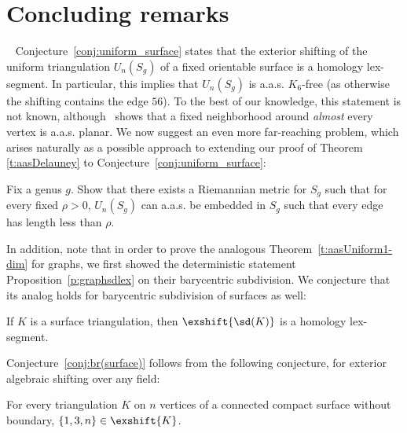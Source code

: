 \section{Concluding remarks}~\label{sec:Conclude}
Conjecture~\ref{conj:uniform_surface} states that the exterior shifting of the uniform triangulation $U_n(S_g)$ of a fixed orientable surface is a homology lex-segment. In particular, this implies that  $U_n(S_g)$ is a.a.s. $K_6$-free (as otherwise the shifting contains the edge $56$). 
To the best of our knowledge, this statement is not known, although~\cite{budzinski2022multi} shows that a fixed neighborhood around \textit{almost} every vertex is a.a.s. planar. We now suggest an even more far-reaching problem, which arises naturally as a possible approach to extending our proof of Theorem \ref{t:aasDelauney} to Conjecture~\ref{conj:uniform_surface}:
%
\begin{problem}
    Fix a genus $g$. Show that there exists a Riemannian metric for $S_g$ such that for every fixed $\rho>0$, $U_n(S_g)$ can a.a.s. be embedded in $S_g$  such that every edge has length less than $\rho$. 
\end{problem}
%
%
In addition, note that in order to prove the analogous Theorem~\ref{t:aasUniform1-dim} for graphs, we first showed the deterministic statement Proposition~\ref{p:graphsdlex} on their barycentric subdivision. We conjecture that its analog holds for barycentric subdivision of surfaces as well:   
\begin{conjecture}\label{conj:br(surface)}
    If $K$ is a surface triangulation, then $\exshift{\sd(K)}$ is a homology lex-segment.
\end{conjecture}
Conjecture~\ref{conj:br(surface)} follows from the following conjecture, for exterior algebraic shifting over any field:
\begin{conjecture}
\label{conj:area-rig}
For every triangulation $K$ on $n$ vertices of a connected compact surface without boundary, 
$\{1,3,n\} \in \exshift{K}$. 
\end{conjecture}

